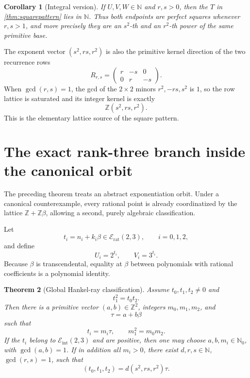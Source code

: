 \documentclass[11pt]{article}
\numberwithin{equation}{section}
\newtheorem{theorem}{Theorem}[section]
\newtheorem{corollary}[theorem]{Corollary}
\theoremstyle{definition}
\newcommand{\Z}{\mathbb{Z}}
\newcommand{\N}{\mathbb{N}}
\newcommand{\Erat}{\mathcal E_{\mathrm{rat}}}
\newcommand{\Eint}{\mathcal E_{\mathrm{int}}}
\begin{document}
\begin{corollary}[Integral version]\label{cor:integralsquare}
If \(U,V,W\in\N\) and \(r,s>0\), then the \(T\) in \cref{thm:squarepattern} lies in \(\N\). Thus both endpoints are perfect squares whenever \(r,s>1\), and more precisely they are an \(s^2\)-th and an \(r^2\)-th power of the same primitive base.
\end{corollary}

The exponent vector \((s^2,rs,r^2)\) is also the primitive kernel direction of the two recurrence rows
\[
  R_{r,s}=
  \begin{pmatrix}
    r&-s&0\\
    0&r&-s
  \end{pmatrix}.
\]
When \(\gcd(r,s)=1\), the gcd of the \(2\times2\) minors \(r^2,-rs,s^2\) is \(1\), so the row lattice is saturated and its integer kernel is exactly
\[
        \Z(s^2,rs,r^2).
\]
This is the elementary lattice source of the square pattern.

\section{The exact rank-three branch inside the canonical orbit}

The preceding theorem treats an abstract exponentiation orbit. Under a canonical counterexample, every rational point is already coordinatized by the lattice \(\Z+\Z\beta\), allowing a second, purely algebraic classification.

Let
\[
       t_i=n_i+k_i\beta\in\Erat(2,3),
       \qquad i=0,1,2,
\]
and define
\[
       U_i=2^{t_i},\qquad V_i=3^{t_i}.
\]
Because \(\beta\) is transcendental, equality at \(\beta\) between polynomials with rational coefficients is a polynomial identity.

\begin{theorem}[Global Hankel-ray classification]\label{thm:globalhankel}
Assume \(t_0,t_1,t_2\ne0\) and
\begin{equation}\label{eq:texphankel}
       t_1^2=t_0t_2.
\end{equation}
Then there is a primitive vector \((a,b)\in\Z^2\), integers \(m_0,m_1,m_2\), and
\[
       \tau=a+b\beta
\]
such that
\[
       t_i=m_i\tau,
       \qquad
       m_1^2=m_0m_2.
\]
If the \(t_i\) belong to \(\Eint(2,3)\) and are positive, then one may choose \(a,b,m_i\in\N_0\), with \(\gcd(a,b)=1\). If in addition all \(m_i>0\), there exist \(d,r,s\in\N\), \(\gcd(r,s)=1\), such that
\begin{equation}\label{eq:globalray}
       (t_0,t_1,t_2)
        =d(s^2,rs,r^2)\tau.
\end{equation}
\end{theorem}
\end{document}
